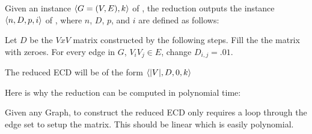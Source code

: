 \documentclass[11pt]{article}
\begin{document}
\begin{problems}


  \problem %

  Given an instance $\langle G=(V,E),k \rangle$ of ,
  the reduction outputs the instance $\langle n, D, p, i \rangle$ of ,
  where $n$, $D$, $p$, and $i$ are defined as follows:

  \lineacross 

  Let $D$ be the $VxV$ matrix constructed by the following steps. Fill the the matrix with zeroes. 
    For every edge in $G$, $V_iV_j \in E$, change $D_{i,j} = .01$.

  The reduced ECD will be of the form $\langle |V|, D, 0, k \rangle$

  \lineacross 

  \medskip 
  Here is why the reduction can be computed in polynomial time:
  
  \lineacross 

  Given any Graph, to construct the reduced ECD only requires a loop through the edge set to setup the matrix. 
    This should be linear which is easily polynomial.

  \lineacross 
  

\end{problems}
\end{document}

